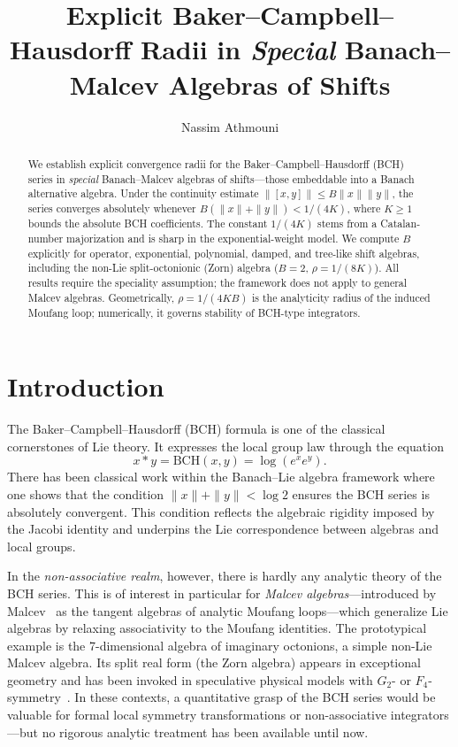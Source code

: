\documentclass[11pt]{amsart}
\title[Explicit Baker--Campbell--Hausdorff Radii]{Explicit Baker--Campbell--Hausdorff Radii in \textit{Special} Banach--Malcev Algebras of Shifts}
\author{Nassim Athmouni}
\numberwithin{equation}{section}
\theoremstyle{remark}
\begin{document}


\begin{abstract}
We establish explicit convergence radii for the Baker--Campbell--Hausdorff (BCH) series in \emph{special} Banach--Malcev algebras of shifts—those embeddable into a Banach alternative algebra. Under the continuity estimate $\|[x,y]\|\leq B\|x\|\|y\|$, the series converges absolutely whenever $B(\|x\|+\|y\|)<1/(4K)$, where $K\geq1$ bounds the absolute BCH coefficients. The constant $1/(4K)$ stems from a Catalan-number majorization and is sharp in the exponential-weight model. We compute $B$ explicitly for operator, exponential, polynomial, damped, and tree-like shift algebras, including the non-Lie split-octonionic (Zorn) algebra ($B=2$, $\rho=1/(8K)$). All results require the speciality assumption; the framework does not apply to general Malcev algebras. Geometrically, $\rho=1/(4KB)$ is the analyticity radius of the induced Moufang loop; numerically, it governs stability of BCH-type integrators.
\end{abstract}
\maketitle
\tableofcontents
\bigskip

\section{Introduction}\label{sec:intro}

The Baker--Campbell--Hausdorff (BCH) formula is one of the classical cornerstones of Lie theory. It expresses the local group law through the equation
\[
x * y = \mathrm{BCH}(x,y) = \log(e^x e^y).
\]
There has been classical work within the Banach--Lie algebra framework where one shows that the condition $\|x\| + \|y\| < \log 2$ ensures the BCH series is absolutely convergent. This condition reflects the algebraic rigidity imposed by the Jacobi identity and underpins the Lie correspondence between algebras and local groups.

\medskip

In the \emph{non-associative realm}, however, there is hardly any analytic theory of the BCH series. This is of interest in particular for \emph{Malcev algebras}—introduced by Malcev~\cite{Malcev1955} as the tangent algebras of analytic Moufang loops—which generalize Lie algebras by relaxing associativity to the Moufang identities. The prototypical example is the 7-dimensional algebra of imaginary octonions, a simple non-Lie Malcev algebra. Its split real form (the Zorn algebra) appears in exceptional geometry and has been invoked in speculative physical models with $G_2$- or $F_4$-symmetry~\cite{Baez2002,GursyTze,Okubo}. In these contexts, a quantitative grasp of the BCH series would be valuable for formal local symmetry transformations or non-associative integrators—but no rigorous analytic treatment has been available until now.
\end{document}
